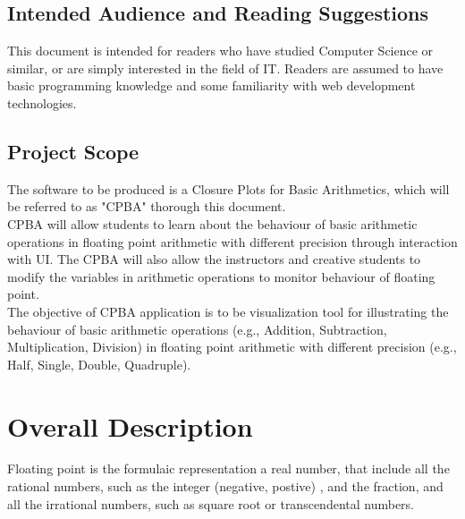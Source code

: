 \documentclass[11pt]{article}
\begin{document}
\subsection{Intended Audience and Reading Suggestions}
This document is intended for readers who have studied Computer Science or similar, or are simply interested in the field of IT. Readers are assumed to have basic programming knowledge and some familiarity with web development technologies.

\subsection{Project Scope}
The software to be produced is a Closure Plots for Basic Arithmetics, which will be referred to as "CPBA" thorough this document.\\

CPBA will allow students to learn about the behaviour of basic arithmetic operations in floating point arithmetic with different precision through interaction with UI. The CPBA will also allow the instructors and creative students to modify the variables in arithmetic operations to monitor behaviour of floating point.\\

The objective of CPBA application is to be visualization tool for illustrating the behaviour of basic arithmetic operations (e.g., Addition, Subtraction, Multiplication, Division) in floating point arithmetic with different precision (e.g., Half, Single, Double, Quadruple).\\





\section{Overall Description}%
Floating point is the formulaic representation a real number, that include all the rational numbers, such as the integer (negative, postive) , and the fraction, and all the irrational numbers, such as square root or  transcendental numbers.\\
\end{document}
